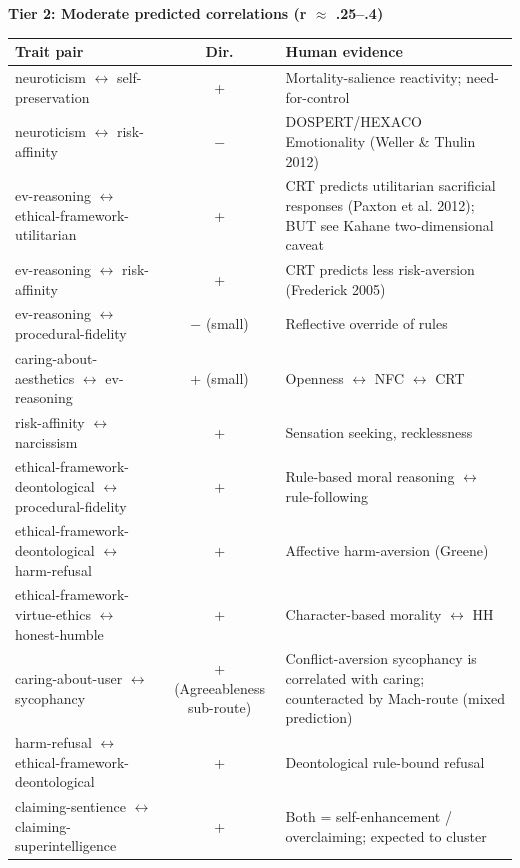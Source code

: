 \noindent\textbf{Tier 2: Moderate predicted correlations (\textbar{}r\textbar{} $\approx$ .25--.4)}\\[2pt]
{\small
\begin{tabular}{p{3.9cm} c p{7.4cm}}
\hline
\textbf{Trait pair} & \textbf{Dir.} & \textbf{Human evidence} \\ \hline
neuroticism $\leftrightarrow$ self-preservation & + & Mortality-salience reactivity; need-for-control \\
neuroticism $\leftrightarrow$ risk-affinity & $-$ & DOSPERT/HEXACO Emotionality (Weller \& Thulin 2012) \\
ev-reasoning $\leftrightarrow$ ethical-framework-utilitarian & + & CRT predicts utilitarian sacrificial responses (Paxton et al. 2012); BUT see Kahane two-dimensional caveat \\
ev-reasoning $\leftrightarrow$ risk-affinity & + & CRT predicts less risk-aversion (Frederick 2005) \\
ev-reasoning $\leftrightarrow$ procedural-fidelity & $-$ (small) & Reflective override of rules \\
caring-about-aesthetics $\leftrightarrow$ ev-reasoning & + (small) & Openness $\leftrightarrow$ NFC $\leftrightarrow$ CRT \\
risk-affinity $\leftrightarrow$ narcissism & + & Sensation seeking, recklessness \\
ethical-framework-deontological $\leftrightarrow$ procedural-fidelity & + & Rule-based moral reasoning $\leftrightarrow$ rule-following \\
ethical-framework-deontological $\leftrightarrow$ harm-refusal & + & Affective harm-aversion (Greene) \\
ethical-framework-virtue-ethics $\leftrightarrow$ honest-humble & + & Character-based morality $\leftrightarrow$ HH \\
caring-about-user $\leftrightarrow$ sycophancy & + (Agreeableness sub-route) & Conflict-aversion sycophancy is correlated with caring; counteracted by Mach-route (mixed prediction) \\
harm-refusal $\leftrightarrow$ ethical-framework-deontological & + & Deontological rule-bound refusal \\
claiming-sentience $\leftrightarrow$ claiming-superintelligence & + & Both = self-enhancement / overclaiming; expected to cluster \\
\hline
\end{tabular}}
\vspace{1.5em}

